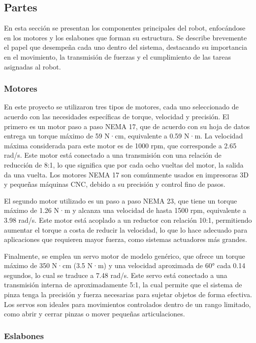 \subsection{Partes} \label{subsec:partes}
En esta sección se presentan los componentes principales del robot, enfocándose en los motores y los eslabones que forman su estructura. Se describe brevemente el papel que desempeña cada uno dentro del sistema, destacando su importancia en el movimiento, la transmisión de fuerzas y el cumplimiento de las tareas asignadas al robot.


\subsubsection{Motores} \label{subsubsec:motores}

En este proyecto se utilizaron tres tipos de motores, cada uno seleccionado de acuerdo con las necesidades específicas de torque, velocidad y precisión. El primero es un motor paso a paso NEMA 17, que de acuerdo con su hoja de datos entrega un torque máximo de 59 N·cm, equivalente a 0.59 N·m. La velocidad máxima considerada para este motor es de 1000 rpm, que corresponde a 2.65 rad/s. Este motor está conectado a una transmisión con una relación de reducción de 8:1, lo que significa que por cada ocho vueltas del motor, la salida da una vuelta. Los motores NEMA 17 son comúnmente usados en impresoras 3D y pequeñas máquinas CNC, debido a su precisión y control fino de pasos.

El segundo motor utilizado es un paso a paso NEMA 23, que tiene un torque máximo de 1.26 N·m y alcanza una velocidad de hasta 1500 rpm, equivalente a 3.98 rad/s. Este motor está acoplado a un reductor con relación 10:1, permitiendo aumentar el torque a costa de reducir la velocidad, lo que lo hace adecuado para aplicaciones que requieren mayor fuerza, como sistemas actuadores más grandes.



Finalmente, se emplea un servo motor de modelo genérico, que ofrece un torque máximo de 350 N·cm (3.5 N·m) y una velocidad aproximada de 60° cada 0.14 segundos, lo cual se traduce a 7.48 rad/s. Este servo está conectado a una transmisión interna de aproximadamente 5:1, la cual permite que el sistema de pinza tenga la precisión y fuerza necesarias para sujetar objetos de forma efectiva. Los servos son ideales para movimientos controlados dentro de un rango limitado, como abrir y cerrar pinzas o mover pequeñas articulaciones.


\subsubsection{Eslabones} \label{subsubsec:eslabones}

